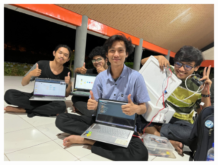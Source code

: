 \begin{figure}[H]
     \centering
     \includegraphics[width=13cm]{image/desotmantapjiwa.jpg}
\end{figure}
